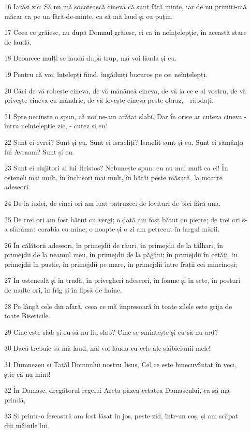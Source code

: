 \par 16 Iarăși zic: Să nu mă socotească cineva că sunt fără minte, iar de nu primiți-mă măcar ca pe un fără-de-minte, ca să mă laud și eu puțin.
\par 17 Ceea ce grăiesc, nu după Domnul grăiesc, ci ca în neînțelepție, în această stare de laudă.
\par 18 Deoarece mulți se laudă după trup, mă voi lăuda și eu.
\par 19 Pentru că voi, înțelepți fiind, îngăduiți bucuros pe cei neînțelepți.
\par 20 Căci de vă robește cineva, de vă mănâncă cineva, de vă ia ce e al vostru, de vă privește cineva cu mândrie, de vă lovește cineva peste obraz, - răbdați.
\par 21 Spre necinste o spun, că noi ne-am arătat slabi. Dar în orice ar cuteza cineva - întru neînțelepție zic, - cutez și eu!
\par 22 Sunt ei evrei? Sunt și eu. Sunt ei israeliți? Israelit sunt și eu. Sunt ei sămânța lui Avraam? Sunt și eu.
\par 23 Sunt ei slujitori ai lui Hristos? Nebunește spun: eu nu mai mult ca ei! În osteneli mai mult, în închisori mai mult, în bătăi peste măsură, la moarte adeseori.
\par 24 De la iudei, de cinci ori am luat patruzeci de lovituri de bici fără una.
\par 25 De trei ori am fost bătut cu vergi; o dată am fost bătut cu pietre; de trei ori s-a sfărâmat corabia cu mine; o noapte și o zi am petrecut în largul mării.
\par 26 În călătorii adeseori, în primejdii de râuri, în primejdii de la tâlhari, în primejdii de la neamul meu, în primejdii de la păgâni; în primejdii în cetăți, în primejdii în pustie, în primejdii pe mare, în primejdii între frații cei mincinoși;
\par 27 În osteneală și în trudă, în privegheri adeseori, în foame și în sete, în posturi de multe ori, în frig și în lipsă de haine.
\par 28 Pe lângă cele din afară, ceea ce mă împresoară în toate zilele este grija de toate Bisericile.
\par 29 Cine este slab și eu să nu fiu slab? Cine se smintește și eu să nu ard?
\par 30 Dacă trebuie să mă laud, mă voi lăuda cu cele ale slăbiciunii mele!
\par 31 Dumnezeu și Tatăl Domnului nostru Iisus, Cel ce este binecuvântat în veci, știe că nu mint!
\par 32 În Damasc, dregătorul regelui Areta păzea cetatea Damascului, ca să mă prindă,
\par 33 Și printr-o fereastră am fost lăsat în jos, peste zid, într-un coș, și am scăpat din mâinile lui.

